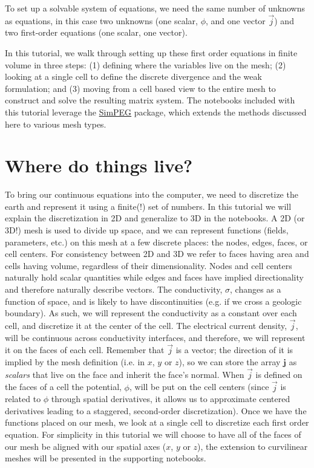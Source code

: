 \documentclass[review,authoryear,12pt]{elsarticle}
\begin{document}
To set up a solvable system of equations, we need the same number of unknowns as equations, in this case two unknowns (one scalar, $\phi$, and one vector $\vec{j}$) and two first-order equations (one scalar, one vector).

In this tutorial, we walk through setting up these first order equations in finite volume in three steps: (1) defining where the variables live on the mesh; (2) looking at a single cell to define the discrete divergence and the weak formulation; and (3) moving from a cell based view to the entire mesh to construct and solve the resulting matrix system. The notebooks included with this tutorial leverage the \href{http://simpeg.xyz/}{SimPEG} package, which extends the methods discussed here to various mesh types.

\section{Where do things live?}\label{Where do things live?}

To bring our continuous equations into the computer, we need to discretize the earth and represent it using a finite(!) set of numbers. In this tutorial we will explain the discretization in 2D and generalize to 3D in the notebooks. A 2D (or 3D!) mesh is used to divide up space, and we can represent functions (fields, parameters, etc.) on this mesh at a few discrete places: the nodes, edges, faces, or cell centers. For consistency between 2D and 3D we refer to faces having area and cells having volume, regardless of their dimensionality. Nodes and cell centers naturally hold scalar quantities while edges and faces have implied directionality and therefore naturally describe vectors. The conductivity, $\sigma$, changes as a function of space, and is likely to have discontinuities (e.g. if we cross a geologic boundary). As such, we will represent the conductivity as a constant over each cell, and discretize it at the center of the cell. The electrical current density, $\vec{j}$, will be continuous across conductivity interfaces, and therefore, we will represent it on the faces of each cell. Remember that $\vec{j}$ is a vector; the direction of it is implied by the mesh definition (i.e. in $x$, $y$ or $z$), so we can store the array $\mathbf{j}$ as \textit{scalars} that live on the face and inherit the face's normal. When $\vec{j}$ is defined on the faces of a cell the potential, $\phi$, will be put on the cell centers (since $\vec{j}$ is related to $\phi$ through spatial derivatives, it allows us to approximate centered derivatives leading to a staggered, second-order discretization). Once we have the functions placed on our mesh, we look at a single cell to discretize each first order equation. For simplicity in this tutorial we will choose to have all of the faces of our mesh be aligned with our spatial axes ($x$, $y$ or $z$), the extension to curvilinear meshes will be presented in the supporting notebooks.
\end{document}
